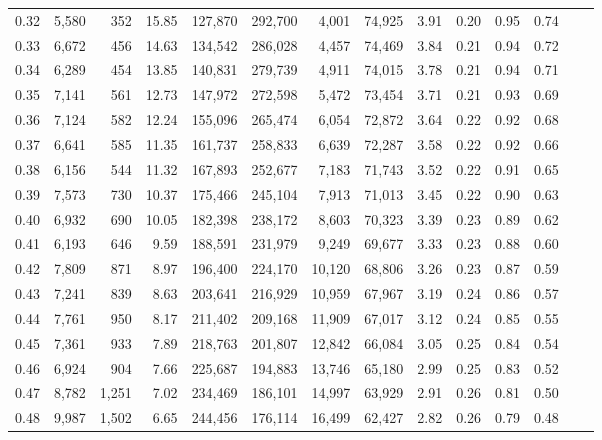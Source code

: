 \begin{tabular}{rrrrrrrrrrrrrr}
0.32 &  5,580 &    352 &    15.85 &  127,870 &  292,700 &   4,001 &  74,925 &  3.91 &  0.20 &  0.95 &      0.74 \\
0.33 &  6,672 &    456 &    14.63 &  134,542 &  286,028 &   4,457 &  74,469 &  3.84 &  0.21 &  0.94 &      0.72 \\
0.34 &  6,289 &    454 &    13.85 &  140,831 &  279,739 &   4,911 &  74,015 &  3.78 &  0.21 &  0.94 &      0.71 \\
0.35 &  7,141 &    561 &    12.73 &  147,972 &  272,598 &   5,472 &  73,454 &  3.71 &  0.21 &  0.93 &      0.69 \\
0.36 &  7,124 &    582 &    12.24 &  155,096 &  265,474 &   6,054 &  72,872 &  3.64 &  0.22 &  0.92 &      0.68 \\
0.37 &  6,641 &    585 &    11.35 &  161,737 &  258,833 &   6,639 &  72,287 &  3.58 &  0.22 &  0.92 &      0.66 \\
0.38 &  6,156 &    544 &    11.32 &  167,893 &  252,677 &   7,183 &  71,743 &  3.52 &  0.22 &  0.91 &      0.65 \\
0.39 &  7,573 &    730 &    10.37 &  175,466 &  245,104 &   7,913 &  71,013 &  3.45 &  0.22 &  0.90 &      0.63 \\
0.40 &  6,932 &    690 &    10.05 &  182,398 &  238,172 &   8,603 &  70,323 &  3.39 &  0.23 &  0.89 &      0.62 \\
0.41 &  6,193 &    646 &     9.59 &  188,591 &  231,979 &   9,249 &  69,677 &  3.33 &  0.23 &  0.88 &      0.60 \\
0.42 &  7,809 &    871 &     8.97 &  196,400 &  224,170 &  10,120 &  68,806 &  3.26 &  0.23 &  0.87 &      0.59 \\
0.43 &  7,241 &    839 &     8.63 &  203,641 &  216,929 &  10,959 &  67,967 &  3.19 &  0.24 &  0.86 &      0.57 \\
0.44 &  7,761 &    950 &     8.17 &  211,402 &  209,168 &  11,909 &  67,017 &  3.12 &  0.24 &  0.85 &      0.55 \\
0.45 &  7,361 &    933 &     7.89 &  218,763 &  201,807 &  12,842 &  66,084 &  3.05 &  0.25 &  0.84 &      0.54 \\
0.46 &  6,924 &    904 &     7.66 &  225,687 &  194,883 &  13,746 &  65,180 &  2.99 &  0.25 &  0.83 &      0.52 \\
0.47 &  8,782 &  1,251 &     7.02 &  234,469 &  186,101 &  14,997 &  63,929 &  2.91 &  0.26 &  0.81 &      0.50 \\
0.48 &  9,987 &  1,502 &     6.65 &  244,456 &  176,114 &  16,499 &  62,427 &  2.82 &  0.26 &  0.79 &      0.48 \\

\end{tabular}

